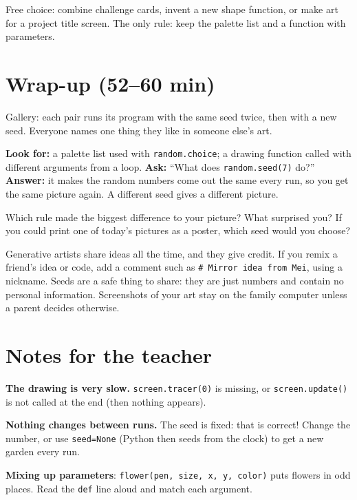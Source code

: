 \begin{freebuild}
Free choice: combine challenge cards, invent a new shape function, or make art for a project title
screen. The only rule: keep the palette list and a function with parameters.
\end{freebuild}

\section{Wrap-up (52--60 min)}
Gallery: each pair runs its program with the same seed twice, then with a new seed. Everyone names
one thing they like in someone else's art.

\begin{formativecheck}
\textbf{Look for:} a palette list used with \texttt{random.choice}; a drawing function called with
different arguments from a loop.
\textbf{Ask:} \enquote{What does \texttt{random.seed(7)} do?}
\textbf{Answer:} it makes the random numbers come out the same every run, so you get the same picture
again. A different seed gives a different picture.
\end{formativecheck}

\begin{reflection}
Which rule made the biggest difference to your picture? What surprised you? If you could print one of
today's pictures as a poster, which seed would you choose?
\end{reflection}

\begin{safety}
Generative artists share ideas all the time, and they give credit. If you remix a friend's idea or
code, add a comment such as \texttt{\# Mirror idea from Mei}, using a nickname. Seeds are a safe thing to
share: they are just numbers and contain no personal information. Screenshots of your art stay on the
family computer unless a parent decides otherwise.
\end{safety}

\section{Notes for the teacher}
\begin{commonmistakes}
  \item \textbf{The drawing is very slow.} \texttt{screen.tracer(0)} is missing, or \texttt{screen.update()} is not called at the end (then nothing appears).
  \item \textbf{Nothing changes between runs.} The seed is fixed: that is correct! Change the number, or use \texttt{seed=None} (Python then seeds from the clock) to get a new garden every run.
  \item \textbf{Mixing up parameters}: \texttt{flower(pen, size, x, y, color)} puts flowers in odd places. Read the \texttt{def} line aloud and match each argument.
\end{commonmistakes}

